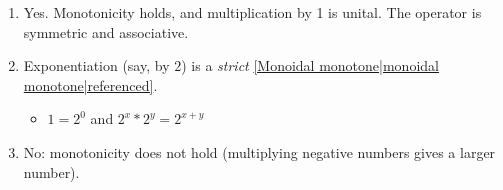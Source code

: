 \begin{enumerate}
    \item   Yes. Monotonicity holds, and multiplication by 1 is unital. The operator is symmetric and associative.
    \item Exponentiation (say, by $2$) is a \emph{strict} \ref{Monoidal monotone|monoidal monotone|referenced}.
          \begin{itemize}
            \item $1 = 2^0$ and $2^x * 2^y = 2^{x+y}$
          \end{itemize}
    \item No: monotonicity does not hold (multiplying negative numbers gives a larger number).

  \end{enumerate}
